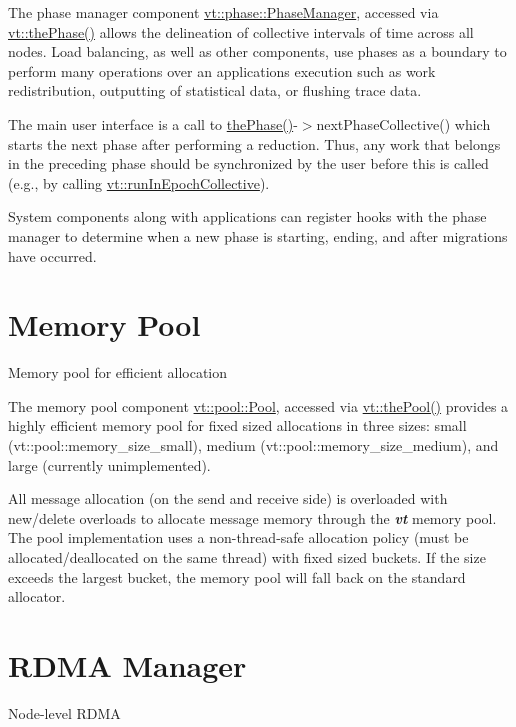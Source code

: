 The phase manager component {\ttfamily \hyperlink{structvt_1_1phase_1_1_phase_manager}{vt\+::phase\+::\+Phase\+Manager}}, accessed via {\ttfamily \hyperlink{namespacevt_a3799d6b51fb71d7b6505760aad457e61}{vt\+::the\+Phase()}} allows the delineation of collective intervals of time across all nodes. Load balancing, as well as other components, use phases as a boundary to perform many operations over an application\textquotesingle{}s execution such as work redistribution, outputting of statistical data, or flushing trace data.

The main user interface is a call to {\ttfamily \hyperlink{namespacevt_a3799d6b51fb71d7b6505760aad457e61}{the\+Phase()}-\/$>$next\+Phase\+Collective()} which starts the next phase after performing a reduction. Thus, any work that belongs in the preceding phase should be synchronized by the user before this is called (e.\+g., by calling {\ttfamily \hyperlink{namespacevt_a291cca514e6f66292df339cd92a54502}{vt\+::run\+In\+Epoch\+Collective}}).

System components along with applications can register hooks with the phase manager to determine when a new phase is starting, ending, and after migrations have occurred. \hypertarget{pool}{}\section{Memory Pool}\label{pool}
Memory pool for efficient allocation

The memory pool component {\ttfamily \hyperlink{structvt_1_1pool_1_1_pool}{vt\+::pool\+::\+Pool}}, accessed via {\ttfamily \hyperlink{namespacevt_aab3530d89a64e5ea903b0ccf303ecbb7}{vt\+::the\+Pool()}} provides a highly efficient memory pool for fixed sized allocations in three sizes\+: small ({\ttfamily vt\+::pool\+::memory\+\_\+size\+\_\+small}), medium ({\ttfamily vt\+::pool\+::memory\+\_\+size\+\_\+medium}), and large (currently unimplemented).

All message allocation (on the send and receive side) is overloaded with new/delete overloads to allocate message memory through the {\bfseries {\itshape vt}} memory pool. The pool implementation uses a non-\/thread-\/safe allocation policy (must be allocated/deallocated on the same thread) with fixed sized buckets. If the size exceeds the largest bucket, the memory pool will fall back on the standard allocator. \hypertarget{rdma}{}\section{R\+D\+MA Manager}\label{rdma}
Node-\/level R\+D\+MA


